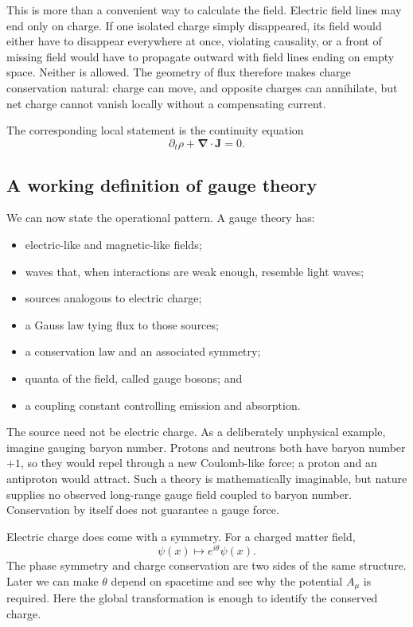 This is more than a convenient way to calculate the field. Electric field
lines may end only on charge. If one isolated charge simply disappeared, its
field would either have to disappear everywhere at once, violating causality,
or a front of missing field would have to propagate outward with field lines
ending on empty space. Neither is allowed. The geometry of flux therefore
makes charge conservation natural: charge can move, and opposite charges can
annihilate, but net charge cannot vanish locally without a compensating
current.

The corresponding local statement is the continuity equation
\begin{equation}
\partial_t\rho+\boldsymbol\nabla\cdot\boldsymbol J=0.
\label{eq:l5-continuity}
\end{equation}

\subsection{A working definition of gauge theory}

We can now state the operational pattern. A gauge theory has:
\begin{itemize}
\item electric-like and magnetic-like fields;
\item waves that, when interactions are weak enough, resemble light waves;
\item sources analogous to electric charge;
\item a Gauss law tying flux to those sources;
\item a conservation law and an associated symmetry;
\item quanta of the field, called gauge bosons; and
\item a coupling constant controlling emission and absorption.
\end{itemize}
The source need not be electric charge. As a deliberately unphysical example,
imagine gauging baryon number. Protons and neutrons both have baryon number
\(+1\), so they would repel through a new Coulomb-like force; a proton and an
antiproton would attract. Such a theory is mathematically imaginable, but
nature supplies no observed long-range gauge field coupled to baryon number.
Conservation by itself does not guarantee a gauge force.

Electric charge does come with a symmetry. For a charged matter field,
\begin{equation}
\psi(x)\longmapsto e^{i\theta}\psi(x).
\label{eq:l5-u1}
\end{equation}
The phase symmetry and charge conservation are two sides of the same
structure. Later we can make \(\theta\) depend on spacetime and see why the
potential \(A_\mu\) is required. Here the global transformation is enough to
identify the conserved charge.

